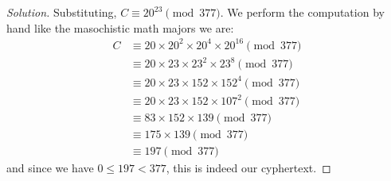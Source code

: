 \begin{enumerate}[(a)]
\begin{proof}[Solution]
          Substituting, $C \equiv 20^{23} \pmod{377}$.
          We perform the computation by hand like the masochistic math majors we are:
          \begin{align*}
            C & \equiv 20 \times 20^2 \times 20^4 \times 20^{16} \pmod{377} \\
              & \equiv 20 \times 23 \times 23^2 \times 23^8 \pmod{377}      \\
              & \equiv 20 \times 23 \times 152 \times 152^4 \pmod{377}      \\
              & \equiv 20 \times 23 \times 152 \times 107^2 \pmod{377}      \\
              & \equiv 83 \times 152 \times 139 \pmod{377}                  \\
              & \equiv 175 \times 139 \pmod{377}                            \\
              & \equiv 197 \pmod{377}
          \end{align*}
          and since we have $0 \leq 197 < 377$, this is indeed our cyphertext.
        \end{proof}
\end{enumerate}


